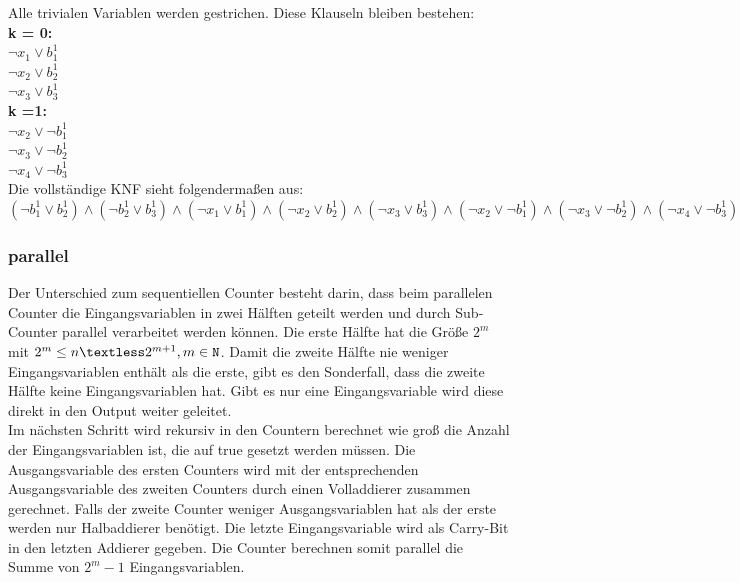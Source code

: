 \documentclass[a4,abstract=on]{scrartcl}
\begin{document}
Alle trivialen Variablen werden gestrichen. Diese Klauseln bleiben bestehen:\\
\textbf{k = 0:}\\
$\neg x_1 \vee b_1^1$\\
$\neg x_2 \vee b_2^1$\\
$\neg x_3 \vee b_3^1$\\
\textbf{k =1:}\\
$\neg x_2 \vee \neg b_1^1 $\\
$\neg x_3 \vee \neg b_2^1 $\\
$\neg x_4 \vee \neg b_3^1 $\\

Die vollständige KNF sieht folgendermaßen aus:\\
$(\neg b_1^1 \vee b_2^1) \wedge (\neg b_2^1 \vee b_3^1) \wedge (\neg x_1 \vee b_1^1) \wedge (\neg x_2 \vee b_2^1) \wedge (\neg x_3 \vee b_3^1) \wedge (\neg x_2 \vee \neg b_1^1) \wedge (\neg x_3 \vee \neg b_2^1) \wedge (\neg x_4 \vee \neg b_3^1) $\\

		\subsubsection{parallel}
Der Unterschied zum sequentiellen Counter besteht darin, dass beim parallelen Counter die Eingangsvariablen in zwei Hälften geteilt werden und durch Sub-Counter parallel verarbeitet werden können. Die erste Hälfte hat die Größe $2^m$ mit  $2^m \leq n \textless 2^{m+1}, m \in \mathtt{N}$. Damit die zweite Hälfte nie weniger Eingangsvariablen enthält als die erste, gibt es den Sonderfall, dass die zweite Hälfte keine Eingangsvariablen hat. Gibt es nur eine Eingangsvariable wird diese direkt in den Output weiter geleitet.\\
Im nächsten Schritt wird rekursiv in den Countern berechnet wie groß die Anzahl der Eingangsvariablen ist, die auf true gesetzt werden müssen. Die Ausgangsvariable des ersten Counters wird mit der entsprechenden Ausgangsvariable des zweiten Counters durch einen Volladdierer zusammen gerechnet. Falls der zweite Counter weniger Ausgangsvariablen hat als der erste werden nur Halbaddierer benötigt. Die letzte Eingangsvariable wird als Carry-Bit in den letzten Addierer gegeben. Die Counter berechnen somit parallel die Summe von $2^m-1$ Eingangsvariablen.\\
\end{document}
